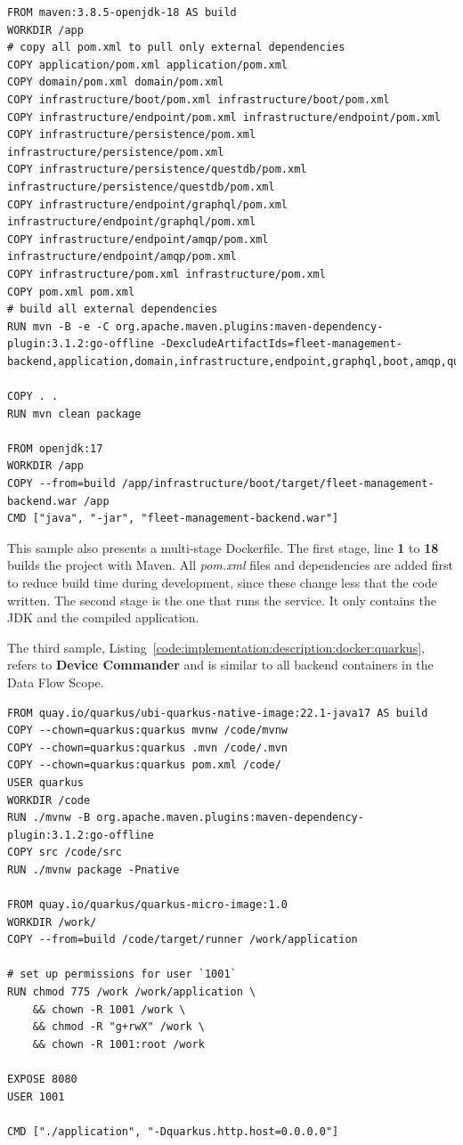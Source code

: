 \begin{lstlisting}[caption=Dockerfile for Fleet Management Backend, label={code:implementation:description:docker:spring}]
FROM maven:3.8.5-openjdk-18 AS build
WORKDIR /app
# copy all pom.xml to pull only external dependencies
COPY application/pom.xml application/pom.xml
COPY domain/pom.xml domain/pom.xml
COPY infrastructure/boot/pom.xml infrastructure/boot/pom.xml
COPY infrastructure/endpoint/pom.xml infrastructure/endpoint/pom.xml
COPY infrastructure/persistence/pom.xml infrastructure/persistence/pom.xml
COPY infrastructure/persistence/questdb/pom.xml infrastructure/persistence/questdb/pom.xml
COPY infrastructure/endpoint/graphql/pom.xml infrastructure/endpoint/graphql/pom.xml
COPY infrastructure/endpoint/amqp/pom.xml infrastructure/endpoint/amqp/pom.xml
COPY infrastructure/pom.xml infrastructure/pom.xml
COPY pom.xml pom.xml
# build all external dependencies
RUN mvn -B -e -C org.apache.maven.plugins:maven-dependency-plugin:3.1.2:go-offline -DexcludeArtifactIds=fleet-management-backend,application,domain,infrastructure,endpoint,graphql,boot,amqp,questdb

COPY . .
RUN mvn clean package

FROM openjdk:17
WORKDIR /app
COPY --from=build /app/infrastructure/boot/target/fleet-management-backend.war /app
CMD ["java", "-jar", "fleet-management-backend.war"]
\end{lstlisting}

This sample also presents a multi-stage Dockerfile. The first stage, line \textbf{1} to \textbf{18} builds the project with Maven. All \textit{pom.xml} files and dependencies are added first to reduce build time during development, since these change less that the code written. The second stage is the one that runs the  service. It only contains the \gls{JDK} and the compiled application.

The third sample, Listing~\ref{code:implementation:description:docker:quarkus}, refers to \textbf{Device Commander} and is similar to all backend containers in the Data Flow Scope.

\begin{lstlisting}[caption=Dockerfile for Device Commander, label={code:implementation:description:docker:quarkus}]
FROM quay.io/quarkus/ubi-quarkus-native-image:22.1-java17 AS build
COPY --chown=quarkus:quarkus mvnw /code/mvnw
COPY --chown=quarkus:quarkus .mvn /code/.mvn
COPY --chown=quarkus:quarkus pom.xml /code/
USER quarkus
WORKDIR /code
RUN ./mvnw -B org.apache.maven.plugins:maven-dependency-plugin:3.1.2:go-offline
COPY src /code/src
RUN ./mvnw package -Pnative

FROM quay.io/quarkus/quarkus-micro-image:1.0
WORKDIR /work/
COPY --from=build /code/target/runner /work/application

# set up permissions for user `1001`
RUN chmod 775 /work /work/application \
    && chown -R 1001 /work \
    && chmod -R "g+rwX" /work \
    && chown -R 1001:root /work

EXPOSE 8080
USER 1001

CMD ["./application", "-Dquarkus.http.host=0.0.0.0"]
\end{lstlisting}


